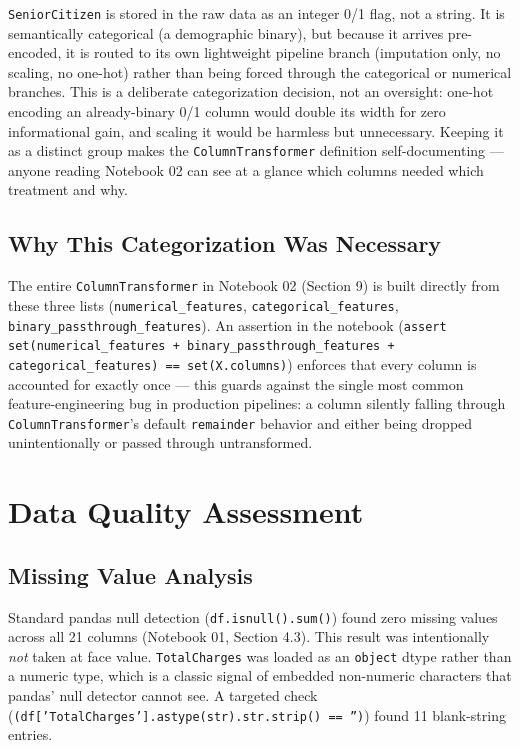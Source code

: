 \documentclass[11pt]{article}
\newcommand{\artifact}[1]{\texttt{\color{navy}#1}}
\begin{document}
\artifact{SeniorCitizen} is stored in the raw data as an integer 0/1 flag, not a string. It is semantically categorical (a demographic binary), but because it arrives pre-encoded, it is routed to its own lightweight pipeline branch (imputation only, no scaling, no one-hot) rather than being forced through the categorical or numerical branches. This is a deliberate categorization decision, not an oversight: one-hot encoding an already-binary 0/1 column would double its width for zero informational gain, and scaling it would be harmless but unnecessary. Keeping it as a distinct group makes the \texttt{ColumnTransformer} definition self-documenting --- anyone reading Notebook 02 can see at a glance which columns needed which treatment and why.

\subsection{Why This Categorization Was Necessary}

The entire \texttt{ColumnTransformer} in Notebook 02 (Section 9) is built directly from these three lists (\texttt{numerical\_features}, \texttt{categorical\_features}, \texttt{binary\_passthrough\_features}). An assertion in the notebook (\texttt{assert set(numerical\_features + binary\_passthrough\_features + categorical\_features) == set(X.columns)}) enforces that every column is accounted for exactly once --- this guards against the single most common feature-engineering bug in production pipelines: a column silently falling through \texttt{ColumnTransformer}'s default \texttt{remainder} behavior and either being dropped unintentionally or passed through untransformed.

\section{Data Quality Assessment}

\subsection{Missing Value Analysis}

Standard pandas null detection (\texttt{df.isnull().sum()}) found zero missing values across all 21 columns (Notebook 01, Section 4.3). This result was intentionally \emph{not} taken at face value. \artifact{TotalCharges} was loaded as an \texttt{object} dtype rather than a numeric type, which is a classic signal of embedded non-numeric characters that pandas' null detector cannot see. A targeted check (\texttt{(df['TotalCharges'].astype(str).str.strip() == '')}) found 11 blank-string entries.
\end{document}

